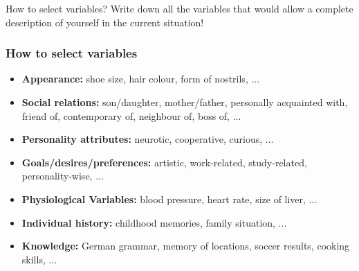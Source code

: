 \documentclass[]{beamer}
\begin{document}
\begin{frame}
 
\begin{exampleblock}{How to select variables?}
Write down all the variables that would allow a complete description of yourself in the current situation! 
\end{exampleblock}
\end{frame}

\begin{frame}
 \frametitle{How to select variables}
\begin{itemize}[<+->]
 \item []\textbf{Appearance:} shoe size, hair colour, form of nostrils, ...
 \item []\textbf{Social relations:} son/daughter, mother/father, personally
acquainted with, friend of, contemporary of, neighbour of, boss of, ...
 \item []\textbf{Personality attributes:} neurotic, cooperative, curious, ...
 \item []\textbf{Goals/desires/preferences:} artistic, work-related,
study-related, personality-wise, ...
 \item []\textbf{Physiological Variables:} blood pressure, heart rate, size of
liver, ...
 \item []\textbf{Individual history:} childhood memories, family situation, ...
 \item []\textbf{Knowledge:} German grammar, memory of locations, soccer
results,
cooking skills, ...
\end{itemize}
\end{frame}
\end{document}
